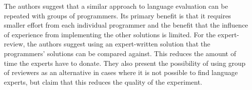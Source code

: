 The authors suggest that a similar approach to language evaluation can be repeated with groups of programmers. Its primary benefit is that it requires smaller effort from each individual programmer and the benefit that the influence of experience from implementing the other solutions is limited.
For the expert-review, the authors suggest using an expert-written solution that the programmers' solutions can be compared against. This reduces the amount of time the experts have to donate. They also present the possibility of using group of reviewers as an alternative in cases where it is not possible to find language experts, but claim that this reduces the quality of the experiment.